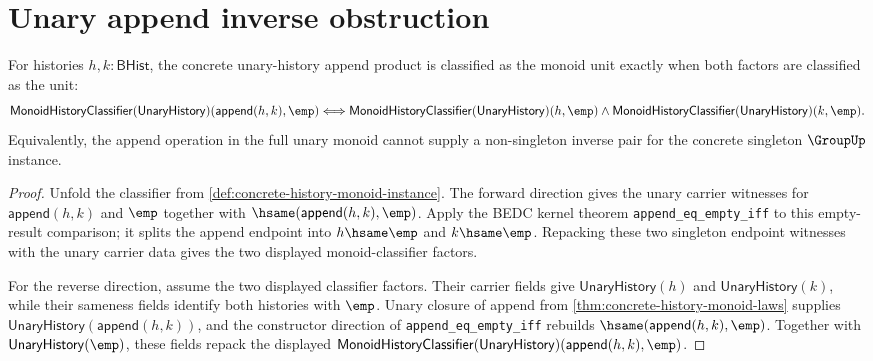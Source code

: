 \section{Unary append inverse obstruction}
\label{sec:group-unary-append-inverse-obstruction}

\begin{theorem}
\label{thm:unary-append-unit-product-factor-exactness}
For histories $h,k:\mathsf{BHist}$, the concrete unary-history append product
is classified as the monoid unit exactly when both factors are classified as
the unit:
$$
\mathsf{MonoidHistoryClassifier}(\mathsf{UnaryHistory})
(\mathsf{append}(h,k),\emp)
\Longleftrightarrow
\mathsf{MonoidHistoryClassifier}(\mathsf{UnaryHistory})(h,\emp)
\land
\mathsf{MonoidHistoryClassifier}(\mathsf{UnaryHistory})(k,\emp).
$$
Equivalently, the append operation in the full unary monoid cannot supply a
non-singleton inverse pair for the concrete singleton $\GroupUp$ instance.
\end{theorem}
\begin{proof}
Unfold the classifier from
\autoref{def:concrete-history-monoid-instance}. The forward direction gives
the unary carrier witnesses for $\mathsf{append}(h,k)$ and $\emp$ together
with $\hsame(\mathsf{append}(h,k),\emp)$. Apply the BEDC kernel theorem
\texttt{append\_eq\_empty\_iff} to this empty-result comparison; it splits the
append endpoint into $h\hsame\emp$ and $k\hsame\emp$. Repacking these two
singleton endpoint witnesses with the unary carrier data gives the two
displayed monoid-classifier factors.

For the reverse direction, assume the two displayed classifier factors. Their
carrier fields give $\mathsf{UnaryHistory}(h)$ and $\mathsf{UnaryHistory}(k)$,
while their sameness fields identify both histories with $\emp$. Unary closure
of append from \autoref{thm:concrete-history-monoid-laws} supplies
$\mathsf{UnaryHistory}(\mathsf{append}(h,k))$, and the constructor direction
of \texttt{append\_eq\_empty\_iff} rebuilds
$\hsame(\mathsf{append}(h,k),\emp)$. Together with
$\mathsf{UnaryHistory}(\emp)$, these fields repack the displayed
$\mathsf{MonoidHistoryClassifier}(\mathsf{UnaryHistory})
(\mathsf{append}(h,k),\emp)$.
\end{proof}

